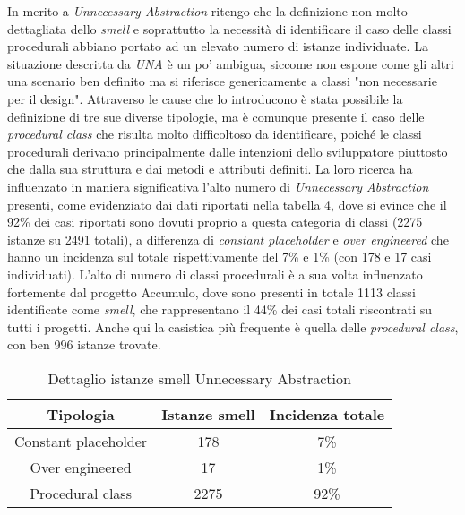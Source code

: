 In merito a \textit{Unnecessary Abstraction} ritengo che 
la definizione non molto dettagliata dello \textit{smell} e soprattutto la necessità di identificare il caso delle classi procedurali abbiano portato ad un elevato numero di istanze individuate. La situazione descritta da \textit{UNA} è un po' ambigua, siccome non espone come gli altri una scenario ben definito ma si riferisce genericamente a classi "non necessarie per il design". Attraverso le cause che lo introducono \cite{SURYANARAYANA201521} è stata possibile la definizione di tre sue diverse tipologie, ma è comunque presente il caso delle \textit{procedural class}
che risulta molto difficoltoso da identificare, poiché le classi procedurali derivano principalmente dalle intenzioni dello sviluppatore piuttosto che dalla sua struttura e dai metodi e attributi definiti.
La loro ricerca ha influenzato in maniera significativa l'alto numero di \textit{Unnecessary Abstraction} presenti, come evidenziato dai dati riportati nella tabella 4, dove si evince che il 92\% dei casi riportati sono dovuti proprio a questa categoria di classi (2275 istanze su 2491 totali), a differenza di \textit{constant placeholder} e \textit{over engineered} che hanno un incidenza sul totale rispettivamente del 7\% e 1\% (con 178 e 17 casi individuati). 
L'alto di numero di classi procedurali è a sua volta influenzato fortemente dal progetto Accumulo, dove sono presenti in totale 1113 classi identificate come \textit{smell}, che rappresentano il 44\% dei casi totali riscontrati su tutti i progetti. Anche qui la casistica più frequente è quella delle \textit{procedural class}, con ben 996 istanze trovate. 

\begin{table}[h]
    \centering
    \begin{tabular}{|c|c|c|}
        \hline
        \textbf{Tipologia} & \textbf{Istanze smell} & \textbf{Incidenza totale}\\
        \hline
        Constant placeholder & 178 & 7\% \\
        Over engineered & 17 & 1\% \\
        Procedural class & 2275 & 92\% \\
        \hline
    \end{tabular}
    \caption{Dettaglio istanze smell Unnecessary Abstraction}
    \label{tab:caption}
\end{table}


  
    
    

